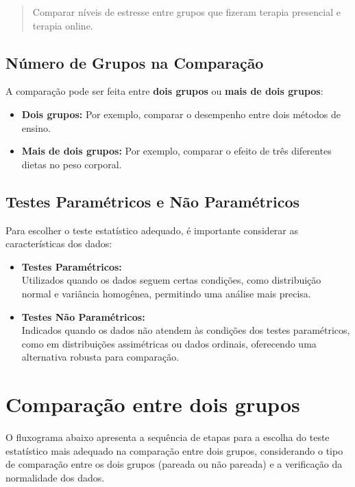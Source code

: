 \documentclass[
]{book}
\providecommand{\tightlist}{%
  \setlength{\itemsep}{0pt}\setlength{\parskip}{0pt}}
\begin{document}
\begin{quote}
Comparar níveis de estresse entre grupos que fizeram terapia presencial e terapia online.
\end{quote}

\section{Número de Grupos na Comparação}\label{nuxfamero-de-grupos-na-comparauxe7uxe3o}

A comparação pode ser feita entre \textbf{dois grupos} ou \textbf{mais de dois grupos}:

\begin{itemize}
\tightlist
\item
  \textbf{Dois grupos:} Por exemplo, comparar o desempenho entre dois métodos de ensino.
\item
  \textbf{Mais de dois grupos:} Por exemplo, comparar o efeito de três diferentes dietas no peso corporal.
\end{itemize}

\section{Testes Paramétricos e Não Paramétricos}\label{testes-paramuxe9tricos-e-nuxe3o-paramuxe9tricos}

Para escolher o teste estatístico adequado, é importante considerar as características dos dados:

\begin{itemize}
\item
  \textbf{Testes Paramétricos:}\\
  Utilizados quando os dados seguem certas condições, como distribuição normal e variância homogênea, permitindo uma análise mais precisa.
\item
  \textbf{Testes Não Paramétricos:}\\
  Indicados quando os dados não atendem às condições dos testes paramétricos, como em distribuições assimétricas ou dados ordinais, oferecendo uma alternativa robusta para comparação.
\end{itemize}

\chapter{Comparação entre dois grupos}\label{comparauxe7uxe3o-entre-dois-grupos}

O fluxograma abaixo apresenta a sequência de etapas para a escolha do teste estatístico mais adequado na comparação entre dois grupos, considerando o tipo de comparação entre os dois grupos (pareada ou não pareada) e a verificação da normalidade dos dados.
\end{document}
